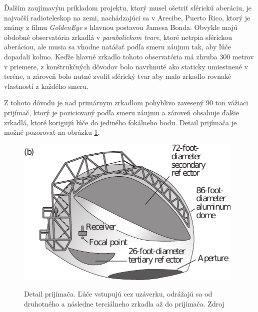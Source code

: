 Ďalším zaujímavým príkladom projektu, ktorý musel ošetriť sférickú aberáciu, je najvačší
radioteleskop na zemi, nachádzajúci sa v Arecibe, Puerto Rico, ktorý je známy z filmu
\textit{GoldenEye} s hlavnou postavou Jamesa Bonda. 
Obvykle majú obdobné observatória zrkadlá v \textit{parabolickom tvare}, ktoré netrpia sférickou
aberáciou, ale musia sa vhodne natáčať podľa smeru záujmu tak, aby ľúče dopadali kolmo. Keďže hlavné zrkadlo tohoto observatória má
zhruba 300 metrov v priemere, z konštrukčných dôvodov bolo navrhnuté ako staticky umiestnené v
teréne, a zároveň
bolo nutné zvoliť sférický tvar aby malo zrkadlo rovnaké vlastnosti z každého smeru.


Z tohoto dôvodu je nad primárnym zrkadlom pohyblivo zavesený 90 ton vážiaci prijímač, ktorý je poziciovaný
podľa smeru záujmu a zároveň obsahuje ďalšie zrkadlá, ktoré korigujú lúče do jediného fokálneho
bodu\cite{hechtoptics}. Detail prijímača je možné pozorovať na obrázku \ref{areciboReceiver}.

\begin{figure}
\includegraphics[scale=0.9]{obrazky-figures/areciboReceiver.pdf}
    \label{areciboReceiver}
    \centering \caption{Detail prijímača. Ľúče vstupujú cez uzáverku, odrážajú sa od druhotného a
    následne terciálneho zrkadla až do prijímača. Zdroj\cite{hechtoptics}}
\end{figure}


